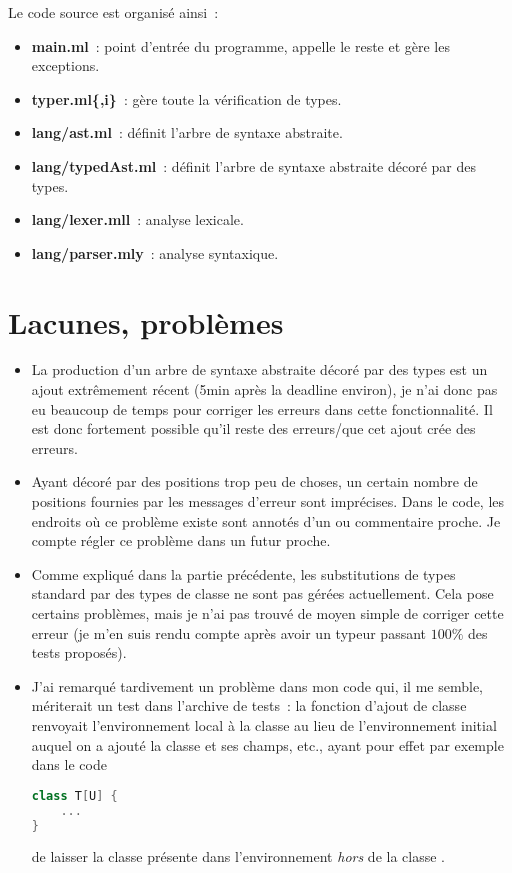 \documentclass[11pt,a4paper]{article}
\begin{document}
\vspace*{1em}
Le code source est organisé ainsi~:
\begin{itemize}
\item \textbf{main.ml}~: point d'entrée du programme, appelle le reste et gère les exceptions.
\item \textbf{typer.ml\{,i\}}~: gère toute la vérification de types.
\item \textbf{lang/ast.ml}~: définit l'arbre de syntaxe abstraite.
\item \textbf{lang/typedAst.ml}~: définit l'arbre de syntaxe abstraite décoré par des types.
\item \textbf{lang/lexer.mll}~: analyse lexicale.
\item \textbf{lang/parser.mly}~: analyse syntaxique.
\end{itemize}

\section{Lacunes, problèmes}

\begin{itemize}
\item La production d'un arbre de syntaxe abstraite décoré par des types est un ajout extrêmement récent (5min après la deadline environ), je n'ai donc pas eu beaucoup de temps pour corriger les erreurs dans cette fonctionnalité. Il est donc fortement possible qu'il reste des erreurs/que cet ajout crée des erreurs.
\item Ayant décoré par des positions trop peu de choses, un certain nombre de positions fournies par les messages d'erreur sont imprécises. Dans le code, les endroits où ce problème existe sont annotés d'un  ou commentaire proche. Je compte régler ce problème dans un futur proche.
\item Comme expliqué dans la partie précédente, les substitutions de types standard par des types de classe ne sont pas gérées actuellement. Cela pose certains problèmes, mais je n'ai pas trouvé de moyen simple de corriger cette erreur (je m'en suis rendu compte après avoir un typeur passant $100\%$ des tests proposés).
\item J'ai remarqué tardivement un problème dans mon code qui, il me semble, mériterait un test dans l'archive de tests~: la fonction d'ajout de classe renvoyait l'environnement local à la classe au lieu de l'environnement initial auquel on a ajouté la classe et ses champs, etc., ayant pour effet par exemple dans le code
\begin{lstlisting}[language=Scala]
class T[U] {
	...
}
\end{lstlisting}
de laisser la classe  présente dans l'environnement \emph{hors} de la classe .
\end{itemize}
\end{document}
